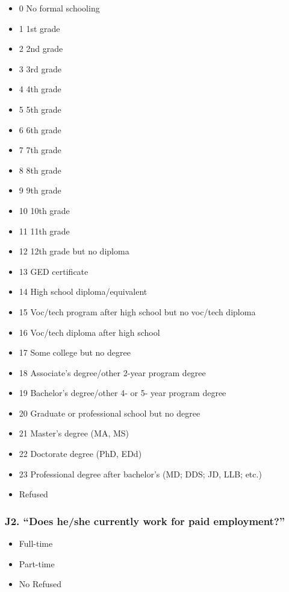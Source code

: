 \documentclass[
  12pt,
]{book}
\providecommand{\tightlist}{%
  \setlength{\itemsep}{0pt}\setlength{\parskip}{0pt}}
\begin{document}
\begin{itemize}
\tightlist
\item
  0 No formal schooling
\item
  1 1st grade
\item
  2 2nd grade
\item
  3 3rd grade
\item
  4 4th grade
\item
  5 5th grade
\item
  6 6th grade
\item
  7 7th grade
\item
  8 8th grade
\item
  9 9th grade
\item
  10 10th grade
\item
  11 11th grade
\item
  12 12th grade but no diploma
\item
  13 GED certificate
\item
  14 High school diploma/equivalent
\item
  15 Voc/tech program after high school but no voc/tech diploma
\item
  16 Voc/tech diploma after high school
\item
  17 Some college but no degree
\item
  18 Associate's degree/other 2-year program degree
\item
  19 Bachelor's degree/other 4- or 5- year program degree
\item
  20 Graduate or professional school but no degree
\item
  21 Master's degree (MA, MS)
\item
  22 Doctorate degree (PhD, EDd)
\item
  23 Professional degree after bachelor's (MD; DDS; JD, LLB; etc.)
\item
  Refused
\end{itemize}

\hypertarget{j2.-does-heshe-currently-work-for-paid-employment}{%
\subsubsection*{J2. ``Does he/she currently work for paid employment?''}\label{j2.-does-heshe-currently-work-for-paid-employment}}

\begin{itemize}
\tightlist
\item
  Full-time
\item
  Part-time
\item
  No Refused
\end{itemize}
\end{document}
